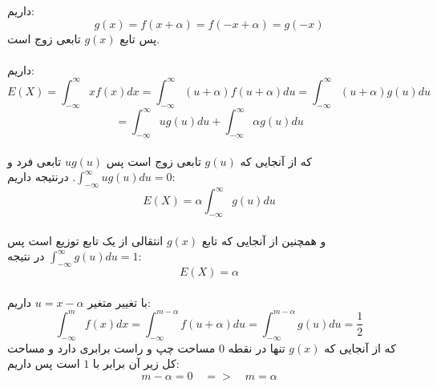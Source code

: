 \parte{}
داریم:\\
\[
    g(x) = f(x+\alpha) = f(-x+\alpha) = g(-x)
\]
پس تابع $g(x)$ 
تابعی زوج است.\\\\
\parte{}
داریم:\\
\[
    E(X) = \int_{-\infty}^{\infty}{xf(x)dx}
    =  \int_{-\infty}^{\infty}{(u+\alpha)f(u+\alpha)du}
    =  \int_{-\infty}^{\infty}{(u+\alpha)g(u)du}
\]
\[
    = \int_{-\infty}^{\infty}{ug(u)du}
    + \int_{-\infty}^{\infty}{\alpha g(u)du}
\]\\
که از آنجایی که $g(u)$ تابعی 
زوج است پس $ug(u)$ تابعی فرد و $\int_{-\infty}^{\infty}{ug(u)du} = 0$.
درنتیجه داریم:\\
\[
    E(X) = \alpha \int_{-\infty}^{\infty}{g(u)du}
\]\\
و همچنین از آنجایی که تابع $g(x)$ 
انتقالی از یک تابع توزیع است پس $\int_{-\infty}^{\infty}{g(u)du} = 1 $
در نتیجه:\\
\[
    E(X) = \alpha
\]\\
\parte{}
با تغییر متغیر $u = x-\alpha$ داریم:\\
\[
    \int_{-\infty}^{m}{f(x)dx} 
    = \int_{-\infty}^{m-\alpha}{f(u+\alpha) du}
    = \int_{-\infty}^{m-\alpha}{g(u)du}
    = \frac{1}{2}
\]
که از آنجایی که $g(x)$ تنها در نقطه $0$
مساحت چپ و راست برابری دارد و مساحت کل زیر آن برابر با $1$
است پس داریم:\\
\[ 
    m-\alpha = 0 \quad => \quad m = \alpha    
\]